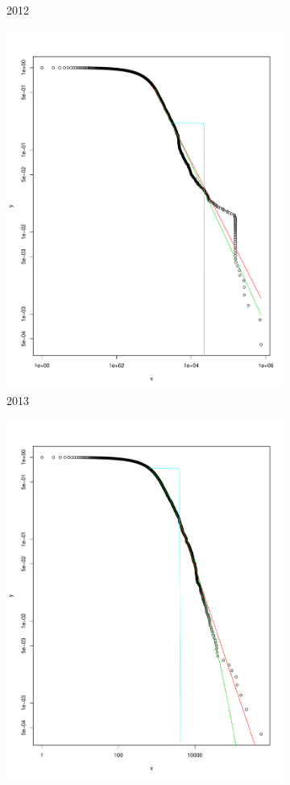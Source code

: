 \documentclass[preprint,12pt]{elsarticle}
\begin{document}
\begin{figure}[H]
\begin{subfigure}{.3\textwidth}
  \caption{2012}
  \label{fig:2012in}
\end{subfigure}
\begin{subfigure}{.3\textwidth}
  \centering
  \includegraphics[width=.8\linewidth]{Bitcoin-graphs/deg-dist-in-2013.pdf}  
  \caption{2013}
  \label{fig:2013in}
\end{subfigure}
\begin{subfigure}{.3\textwidth}
  \centering
  \includegraphics[width=.8\linewidth]{Bitcoin-graphs/deg-dist-in-2014.pdf}  

\end{subfigure}
\end{figure}
\end{document}
